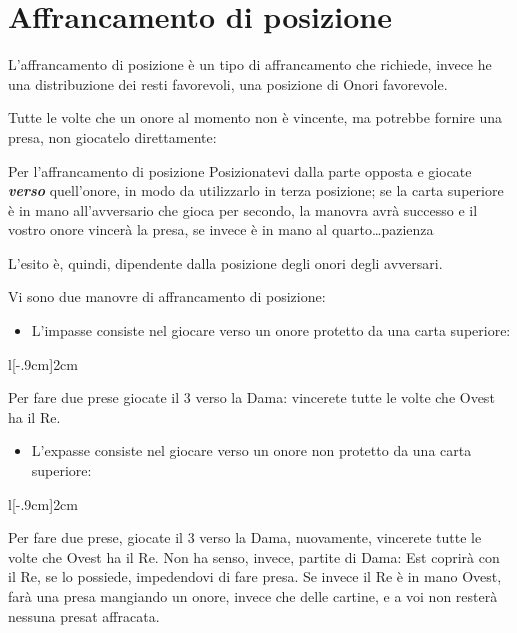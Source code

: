 \documentclass[../corsofiori.tex]{subfiles}
\begin{document}
\newpage

\section{Affrancamento di posizione}

L'affrancamento di posizione è un tipo di affrancamento che richiede, invece he una distribuzione dei resti favorevoli,
una posizione di Onori favorevole.

Tutte le volte che un onore al momento non è vincente, ma potrebbe fornire una presa, non giocatelo direttamente:

\medskip
\begin{regola}{Per l'affrancamento di posizione}
 Posizionatevi dalla parte opposta e giocate \emph{\textbf{verso}} quell'onore, in modo da utilizzarlo in terza
posizione; se la carta superiore è in mano all'avversario che gioca per secondo, la manovra avrà successo e il vostro
onore vincerà la presa, se invece è in mano al quarto\ldots pazienza   
\end{regola}
\medskip

L'esito è, quindi, dipendente dalla posizione degli onori degli avversari.

Vi sono due manovre di affrancamento di posizione:

\begin{itemize}
    \item L'impasse consiste nel giocare verso un onore protetto da una carta superiore:
\end{itemize}

\begin{wraptable}[2]{l}[-.9cm]{2cm}
    \vspace{-1.3cm}
\end{wraptable}

        Per fare due prese giocate il 3 verso la Dama: vincerete tutte le volte che Ovest ha il Re.

\begin{itemize}
    \item L'expasse consiste nel giocare verso un onore non protetto da una carta superiore:
\end{itemize}
\bigskip

\begin{wraptable}[3]{l}[-.9cm]{2cm}
    \vspace{-1.3cm}
\end{wraptable}

Per fare due prese, giocate il 3 verso la Dama, nuovamente, vincerete tutte le volte che Ovest ha il Re. Non ha senso,
invece, partite di Dama: Est coprirà con il Re, se lo possiede, impedendovi di fare presa. Se invece il Re è in mano Ovest, farà una presa
mangiando un onore, invece che delle cartine, e a voi non resterà nessuna presat affracata.
\end{document}

